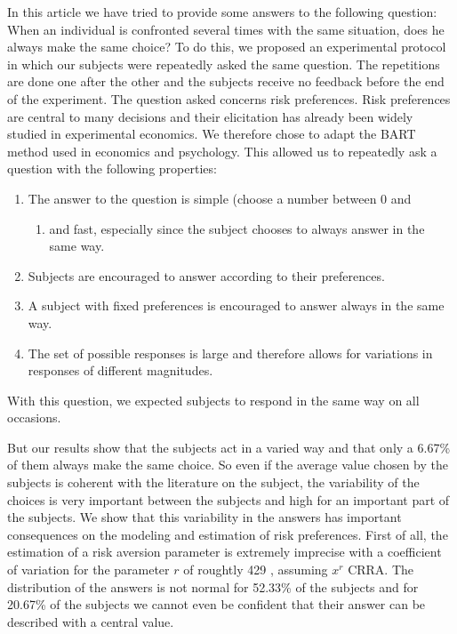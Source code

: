 \documentclass[
]{book}
\providecommand{\tightlist}{%
  \setlength{\itemsep}{0pt}\setlength{\parskip}{0pt}}
\begin{document}
In this article we have tried to provide some answers to the following
question: When an individual is confronted several times with the same
situation, does he always make the same choice? To do this, we proposed
an experimental protocol in which our subjects were repeatedly asked the
same question. The repetitions are done one after the other and the
subjects receive no feedback before the end of the experiment. The question
asked concerns risk preferences. Risk preferences are central to many
decisions and their elicitation has already been widely studied in
experimental economics. We therefore chose to adapt the BART method used
in economics and psychology. This allowed us to repeatedly ask a
question with the following properties:

\begin{enumerate}
\def\labelenumi{\arabic{enumi}.}
\tightlist
\item
  The answer to the question is simple (choose a number between 0 and

  \begin{enumerate}
  \def\labelenumii{\arabic{enumii})}
  \setcounter{enumii}{63}
  \tightlist
  \item
    and fast, especially since the subject chooses to always answer
    in the same way.
  \end{enumerate}
\item
  Subjects are encouraged to answer according to their preferences.
\item
  A subject with fixed preferences is encouraged to answer always in
  the same way.
\item
  The set of possible responses is large and therefore allows for
  variations in responses of different magnitudes.
\end{enumerate}

With this question, we expected subjects to respond in the same way on all
occasions.

But our results show that the subjects act in a varied way and that only
a 6.67\% of them always make
the same choice. So even if the average value chosen by the subjects is
coherent with the literature on the subject, the variability of the
choices is very important between the subjects and high for an important
part of the subjects. We show that this variability in the answers has
important consequences on the modeling and estimation of risk preferences.
First of all, the estimation of a risk aversion parameter
is extremely imprecise with a coefficient of variation for the parameter \(r\) of
roughtly 429 , assuming \(x^r\) CRRA.
The distribution of the answers is not normal for
52.33\% of the subjects
and for 20.67\% of the
subjects we cannot even be confident that their answer can be
described with a central value.
\end{document}
